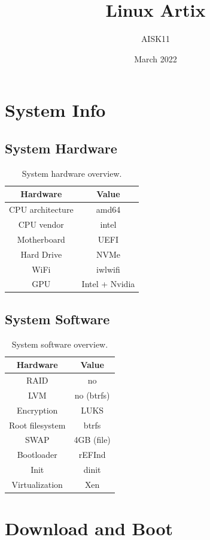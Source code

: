 \documentclass[10pt, a4paper, onecolumn, oneside, titlepage, openany]{book}
\title{\textbf{Linux Artix}}
\author{AISK11}
\date{March 2022}
\begin{document}
\maketitle
\tableofcontents


\chapter{System Info}
\section{System Hardware}
\begin{table}[h!]
\centering
\begin{tabular}{|c|c|}
    \hline
    \textbf{Hardware} & \textbf{Value} \\
    \hline
    CPU architecture & amd64\\
    CPU vendor & intel\\
    Motherboard & UEFI\\
    Hard Drive & NVMe\\
    WiFi & iwlwifi\\
    GPU & Intel + Nvidia\\
    \hline
\end{tabular}
\caption{System hardware overview.}
\label{table:1}
\end{table}

\section{System Software}
\begin{table}[h!]
\centering
\begin{tabular}{|c|c|}
    \hline
    \textbf{Hardware} & \textbf{Value} \\
    \hline
    RAID & no\\
    LVM & no (btrfs)\\
    Encryption & LUKS\\
    Root filesystem & btrfs\\
    SWAP & 4GB (file)\\
    Bootloader & rEFInd\\
    Init & dinit\\
    Virtualization & Xen\\
    \hline
\end{tabular}
\caption{System software overview.}
\label{table:2}
\end{table}


\chapter{Download and Boot}
\end{document}
